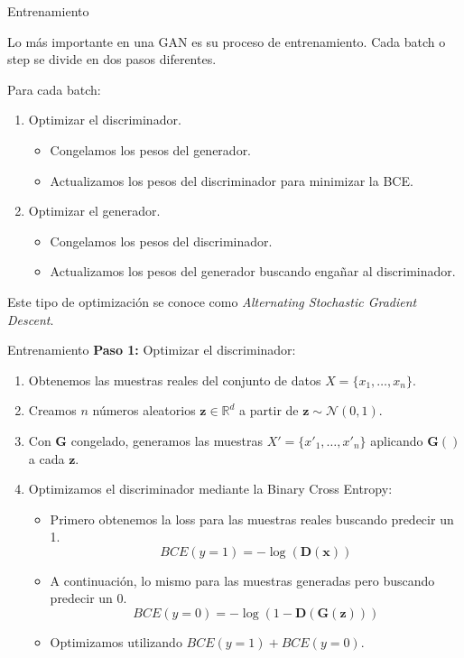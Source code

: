 \documentclass[aspectratio=169]{beamer}
\begin{document}
\begin{frame}[t]{Entrenamiento}

	\begin{block}{}
		Lo más importante en una GAN es su proceso de entrenamiento. Cada batch o step se divide en dos pasos diferentes.
	\end{block}
	\vspace{.3cm}
	Para cada batch:
	\begin{enumerate}
		\item Optimizar el discriminador.
		\begin{itemize}
			\item Congelamos los pesos del generador.
			\item Actualizamos los pesos del discriminador para minimizar la BCE.
		\end{itemize}
		\item Optimizar el generador.
		\begin{itemize}
			\item Congelamos los pesos del discriminador.
			\item Actualizamos los pesos del generador buscando engañar al discriminador.
		\end{itemize}
	\end{enumerate}
	\vspace{.3cm}
	\begin{block}{}
		\center Este tipo de optimización se conoce como \emph{Alternating Stochastic Gradient Descent}.
	\end{block}
	
\end{frame}

\begin{frame}[t]{Entrenamiento}
	\textbf{Paso 1:} Optimizar el discriminador:\\
	\begin{enumerate}
		\item Obtenemos las muestras reales del conjunto de datos $X=\{x_1,\ldots, x_n\}$.
		\item Creamos $n$ números aleatorios $\mathbf z\in\mathbb R^d$ a partir de $\mathbf z \sim \mathcal{N} (0, 1)$.
		\item Con $\mathbf{G}$ congelado, generamos las muestras $X'=\{x'_1,\ldots, x'_n\}$ aplicando $\mathbf{G}()$ a cada $\mathbf z$.
		\item Optimizamos el discriminador mediante la Binary Cross Entropy:
		\begin{itemize}
			\item Primero obtenemos la loss para las muestras reales buscando predecir un 1. 
			$$BCE(y=1) = -\log(\mathbf{D}(\mathbf x))$$
			\item A continuación, lo mismo para las muestras generadas pero buscando predecir un 0. 
			$$BCE(y=0) = -\log(1-\mathbf{D}(\mathbf{G}(\mathbf z)))$$
			\item Optimizamos utilizando $BCE(y=1)+BCE(y=0)$.
		\end{itemize}
	\end{enumerate}
\end{frame}
\end{document}
